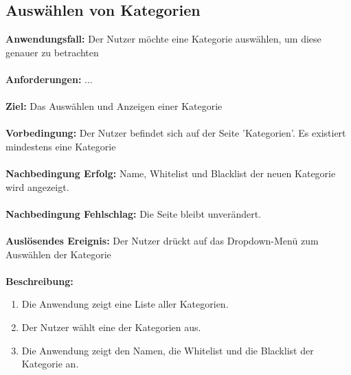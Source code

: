 \documentclass[parskip=full]{scrartcl} %
\begin{document}
\subsection*{Auswählen von Kategorien}
\textbf{Anwendungsfall:} Der Nutzer möchte eine Kategorie auswählen, um diese genauer zu betrachten\\\\
\textbf{Anforderungen:} ...\\\\
\textbf{Ziel:} Das Auswählen und Anzeigen einer Kategorie \\\\
\textbf{Vorbedingung:} Der Nutzer befindet sich auf der Seite 'Kategorien'. Es existiert mindestens eine Kategorie \\\\
\textbf{Nachbedingung Erfolg:} Name, Whitelist und Blacklist der neuen Kategorie wird angezeigt.\\\\
\textbf{Nachbedingung Fehlschlag:} Die Seite bleibt unverändert.\\\\
\textbf{Auslösendes Ereignis:} Der Nutzer drückt auf das Dropdown-Menü zum Auswählen der Kategorie \\\\
\textbf{Beschreibung:}
\begin{enumerate}
    \item Die Anwendung zeigt eine Liste aller Kategorien.
    \item Der Nutzer wählt eine der Kategorien aus.
    \item Die Anwendung zeigt den Namen, die Whitelist und die Blacklist der Kategorie an.
\end{enumerate}
\newpage
\end{document}
